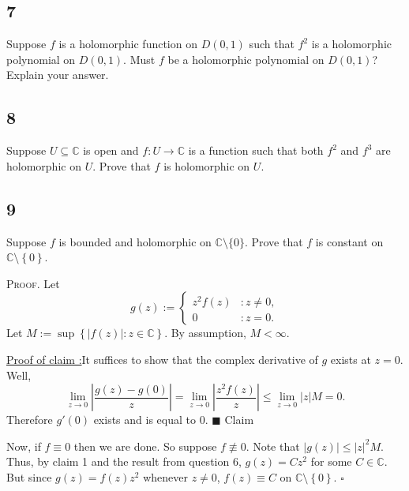 \documentclass[12pt]{article}
\newcounter{ProofCounter}
\newcounter{ClaimCounter}[ProofCounter]
\newenvironment{Proof}{\stepcounter{ProofCounter}\textsc{Proof.}}{\hfill$\square$}
\newenvironment{claim}[1]{\vspace{1mm}\stepcounter{ClaimCounter}\par\noindent\underline{\bf Claim \theClaimCounter:}\space#1}{}
\newenvironment{claimproof}[1]{\par\noindent\underline{Proof of claim \theClaimCounter:}\space#1}{\hfill $\blacksquare$ Claim \theClaimCounter}
\begin{document}
\newpage 
\subsection*{7}
\begin{tcolorbox}
Suppose $f$ is a holomorphic function on $D(0,1)$ such that $f^{2}$ is a holomorphic polynomial on $D(0,1)$. Must $f$ be a holomorphic polynomial on
$D(0,1)$? Explain your answer.
\end{tcolorbox}


\newpage 
\subsection*{8}
\begin{tcolorbox}
Suppose $U\subseteq \mathbb{C}$ is open and $f : U \rightarrow \mathbb{C}$ is a function such that both $f^{2}$ and $f^{3}$ are holomorphic on $U$.
Prove that $f$ is holomorphic on $U$. 
\end{tcolorbox}


\newpage 
\subsection*{9}
\begin{tcolorbox}
Suppose $f$ is bounded and holomorphic on $\mathbb{C}\setminus \{0\}$. Prove that $f$ is constant on $\mathbb{C}\setminus\left\{ 0 \right\}$.
\end{tcolorbox}
\begin{Proof}
Let 
\[ g(z) := \left\{ \begin{array}{cl}
z^{2}f(z) & : z \neq 0, \\
0 & : z = 0. 
\end{array} \right. \]
Let $M := \sup\left\{ |f(z)| : z \in \mathbb{C} \right\}$. By assumption, $M < \infty$.
\begin{claimproof}
It suffices to show that the complex derivative of $g$ exists at $z = 0$. Well, 
\[ \lim_{z\rightarrow 0}\left|\frac{g(z) - g(0)}{z}\right|  = \lim_{z\rightarrow 0}\left|\frac{z^{2}f(z)}{z}\right| 
\leq \lim_{z\rightarrow 0} |z|M = 0. \]
Therefore $g'(0)$ exists and is equal to 0.
\end{claimproof}

Now, if $f \equiv 0$ then we are done. So suppose $f \not\equiv 0$. Note that $|g(z)| \leq |z|^{2}M$. Thus, by claim 1 and the result from question 6,
$g(z) = Cz^{2}$ for some $C \in \mathbb{C}$. But since $g(z) = f(z)z^{2}$ whenever $z \neq 0$, $f(z) \equiv C$ on $\mathbb{C}\setminus \left\{ 0
\right\}$.
\end{Proof}
\end{document}
